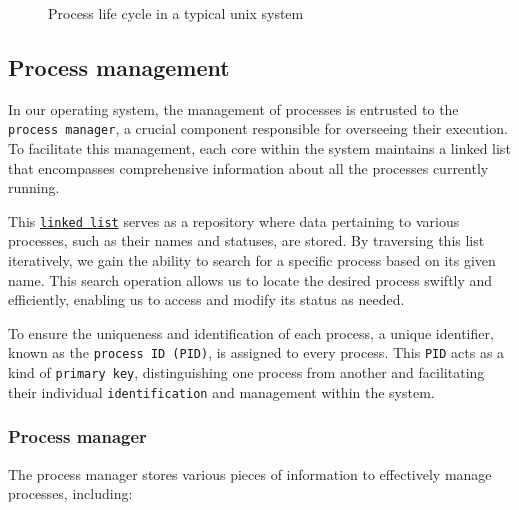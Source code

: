 \begin{figure}[htp]
    \caption[Process life cycle in a typical unix system]{Process life cycle in a typical unix system\footnotemark}
    \label{fig:galaxy}
\end{figure}

\subsection{Process management}
In our operating system, the management of processes is entrusted to the \texttt{process manager}, a crucial component responsible for overseeing their execution. To facilitate this management, each core within the system maintains a linked list that encompasses comprehensive information about all the processes currently running.

This \href{https://en.wikipedia.org/wiki/Linked_list}{\texttt{linked list}} serves as a repository where data pertaining to various processes, such as their names and statuses, are stored. By traversing this list iteratively, we gain the ability to search for a specific process based on its given name. This search operation allows us to locate the desired process swiftly and efficiently, enabling us to access and modify its status as needed.

To ensure the uniqueness and identification of each process, a unique identifier, known as the \texttt{process ID (PID)}, is assigned to every process. This \texttt{PID} acts as a kind of \texttt{primary key}, distinguishing one process from another and facilitating their individual \texttt{identification} and management within the system.

\subsubsection{Process manager}

The process manager stores various pieces of information to effectively manage processes, including:

